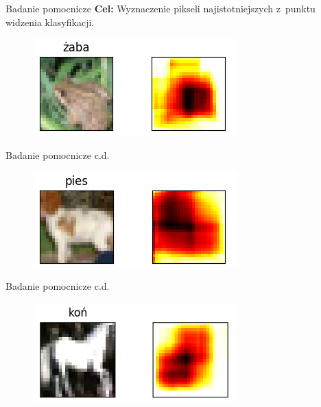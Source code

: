 \documentclass[xcolor=dvipsnames]{beamer}
\begin{document}
\begin{frame}{Badanie pomocnicze}
  \textbf{Cel:} Wyznaczenie pikseli najistotniejszych z~punktu widzenia klasyfikacji.
  \begin{figure}
    \includegraphics[width=\textwidth]{img/heatmap_1.png}
  \end{figure}
\end{frame}
\begin{frame}{Badanie pomocnicze c.d.}
  \begin{figure}
    \includegraphics[width=\textwidth]{img/heatmap_2.png}
  \end{figure}
\end{frame}
\begin{frame}{Badanie pomocnicze c.d.}
  \begin{figure}
    \includegraphics[width=\textwidth]{img/heatmap_3.png}
  \end{figure}
\end{frame}
\end{document}
